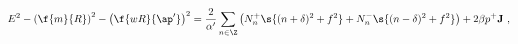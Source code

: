 \begin{equation}
E^2-\left( \f{m}{R} \right)^2 - \left( \f{wR}{\ap'} \right)^2
= \frac{2}{\alpha'} \sum_{n \in \Z} \left(
N^{+}_{n}\s{(n+ \delta)^2+f^2}+N^{-}_{n}\s{(n-\delta)^2+f^2} \right)
+ 2\beta p^+ {\bf J}\ ,
\label{sp1}
\end{equation}

